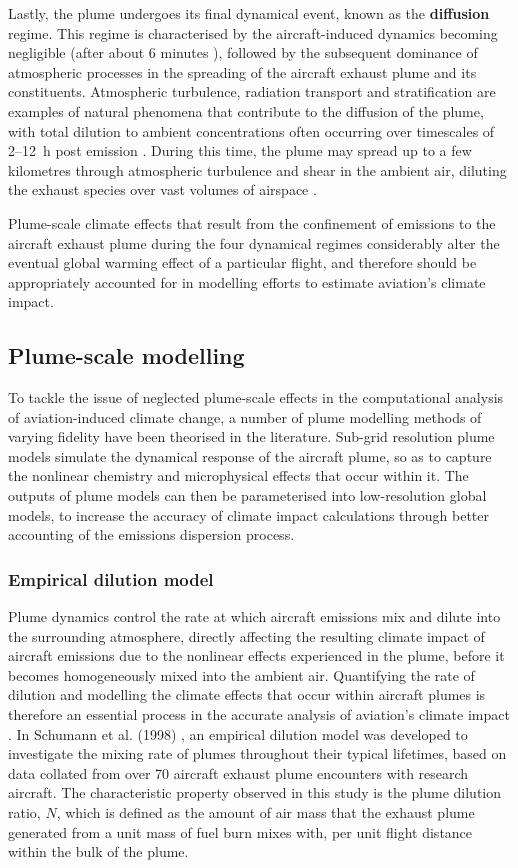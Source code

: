 Lastly, the plume undergoes its final dynamical event, known as the \textbf{diffusion} regime. This regime is characterised by the aircraft-induced dynamics becoming negligible (after about 6 minutes \cite{Unterstrasser2014}), followed by the subsequent dominance of atmospheric processes in the spreading of the aircraft exhaust plume and its constituents. Atmospheric turbulence, radiation transport and stratification are examples of natural phenomena that contribute to the diffusion of the plume, with total dilution to ambient concentrations often occurring over timescales of 2--12~h post emission \cite{EPA1992}. During this time, the plume may spread up to a few kilometres through atmospheric turbulence and shear in the ambient air, diluting the exhaust species over vast volumes of airspace \cite{Schumann1995}.

Plume-scale climate effects that result from the confinement of emissions to the aircraft exhaust plume during the four dynamical regimes considerably alter the eventual global warming effect of a particular flight, and therefore should be appropriately accounted for in modelling efforts to estimate aviation's climate impact.

\subsection{Plume-scale modelling}
To tackle the issue of neglected plume-scale effects in the computational analysis of aviation-induced climate change, a number of plume modelling methods of varying fidelity have been theorised in the literature. Sub-grid resolution plume models simulate the dynamical response of the aircraft plume, so as to capture the nonlinear chemistry and microphysical effects that occur within it. The outputs of plume models can then be parameterised into low-resolution global models, to increase the accuracy of climate impact calculations through better accounting of the emissions dispersion process. 

\subsubsection{Empirical dilution model}
Plume dynamics control the rate at which aircraft emissions mix and dilute into the surrounding atmosphere, directly affecting the resulting climate impact of aircraft emissions due to the nonlinear effects experienced in the plume, before it becomes homogeneously mixed into the ambient air. Quantifying the rate of dilution and modelling the climate effects that occur within aircraft plumes is therefore an essential process in the accurate analysis of aviation's climate impact \cite{Schumann1995}. In Schumann et al. (1998) \cite{Schumann1998}, an empirical dilution model was developed to investigate the mixing rate of plumes throughout their typical lifetimes, based on data collated from over 70 aircraft exhaust plume encounters with research aircraft. The characteristic property observed in this study is the plume dilution ratio, $N$, which is defined as the amount of air mass that the exhaust plume generated from a unit mass of fuel burn mixes with, per unit flight distance within the bulk of the plume. 

